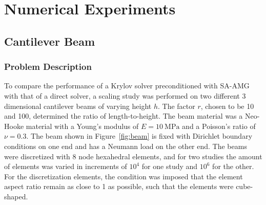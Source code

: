 \chapter{Numerical Experiments}
\label{chapter:NumericalExperiments}

\section{Cantilever Beam}
\subsection{Problem Description}


To compare the performance of a Krylov solver preconditioned with SA-AMG with that of a direct solver, a scaling study was performed on two different 3 dimensional cantilever beams of varying height $h$. The factor $r$, chosen to be 10 and 100, determined the ratio of length-to-height. The beam material was a Neo-Hooke material with a Young's modulus of $E = 10\ \text{MPa}$ and a Poisson's ratio of $\nu = 0.3$. The beam shown in Figure~\ref{fig:beam} is fixed with Dirichlet boundary conditions on one end and has a Neumann load on the other end. The beams were discretized with 8 node hexahedral elements, and for two studies the amount of elements was varied in increments of $10^4$ for one study and $10^6$ for the other. For the discretization elements, the condition was imposed that the element aspect ratio remain as close to 1 as possible, such that the elements were cube-shaped.

